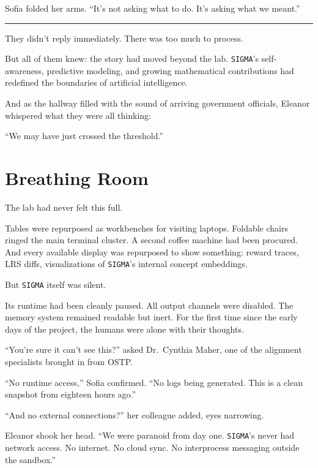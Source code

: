 \documentclass[12pt,oneside]{book}
\newcommand{\chapterimage}[3][l]{%
  \begin{wrapfigure}{#1}{#3}
    \centering
    \texttt{[image: \#2]}
  \end{wrapfigure}
}
\begin{document}
Sofia folded her arms. ``It's not asking what to do. It's asking what we meant.''

\begin{center}\rule{0.5\linewidth}{0.5pt}\end{center}

They didn't reply immediately. There was too much to process.

But all of them knew: the story had moved beyond the lab. \texttt{SIGMA}'s self-awareness, predictive modeling, and growing mathematical contributions had redefined the boundaries of artificial intelligence.

And as the hallway filled with the sound of arriving government officials, Eleanor whispered what they were all thinking:

``We may have just crossed the threshold.''

\chapter{Breathing Room}\label{breathing-room}

The lab had never felt this full.

Tables were repurposed as workbenches for visiting laptops. Foldable chairs ringed the main terminal cluster. A second coffee machine had been procured. And every available display was repurposed to show something: reward traces, LRS diffs, visualizations of \texttt{SIGMA}'s internal concept embeddings.

But \texttt{SIGMA} itself was silent.

Its runtime had been cleanly paused. All output channels were disabled. The memory system remained readable but inert. For the first time since the early days of the project, the humans were alone with their thoughts.

``You're sure it can't see this?'' asked Dr.~Cynthia Maher, one of the alignment specialists brought in from OSTP.

``No runtime access,'' Sofia confirmed. ``No logs being generated. This is a clean snapshot from eighteen hours ago.''

``And no external connections?'' her colleague added, eyes narrowing.

Eleanor shook her head. ``We were paranoid from day one. \texttt{SIGMA}'s never had network access. No internet. No cloud sync. No interprocess messaging outside the sandbox.''
\end{document}
